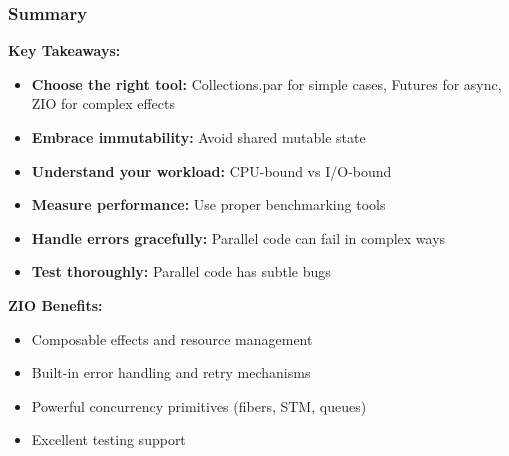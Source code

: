 \documentclass{beamer}
\begin{document}
\begin{frame}
\frametitle{Summary}

\textbf{Key Takeaways:}

\begin{itemize}
\item \textbf{Choose the right tool:} Collections.par for simple cases, Futures for async, ZIO for complex effects
\item \textbf{Embrace immutability:} Avoid shared mutable state
\item \textbf{Understand your workload:} CPU-bound vs I/O-bound
\item \textbf{Measure performance:} Use proper benchmarking tools
\item \textbf{Handle errors gracefully:} Parallel code can fail in complex ways
\item \textbf{Test thoroughly:} Parallel code has subtle bugs
\end{itemize}

\vspace{1em}

\textbf{ZIO Benefits:}
\begin{itemize}
\item Composable effects and resource management
\item Built-in error handling and retry mechanisms
\item Powerful concurrency primitives (fibers, STM, queues)
\item Excellent testing support
\end{itemize}

\end{frame}
\end{document}
